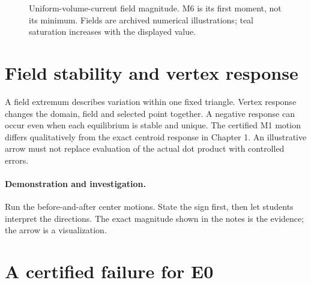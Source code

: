 \documentclass[11pt,oneside,openany]{book}
\begin{document}
\begin{figure}[htbp]
\caption[Uniform-volume-current field magnitude]{Uniform-volume-current field magnitude. M6 is its first moment, not its minimum. Fields are archived numerical illustrations; teal saturation increases with the displayed value.}\label{fig:field-M6}
\end{figure}

\section{Field stability and vertex response}\label{sec:slide28}

A field extremum describes variation within one fixed triangle.
Vertex response changes the domain, field and selected point together.
A negative response can occur even when each equilibrium is stable
and unique. The certified M1 motion differs qualitatively from the
exact centroid response in Chapter 1. An illustrative arrow must not
replace evaluation of the actual dot product with controlled errors.



\paragraph{Demonstration and investigation.} Run the before-and-after center motions. State the sign first, then let students interpret the directions. The exact magnitude shown in the notes is the evidence; the arrow is a visualization.


\section{A certified failure for E0}\label{sec:slide29}
\end{document}

